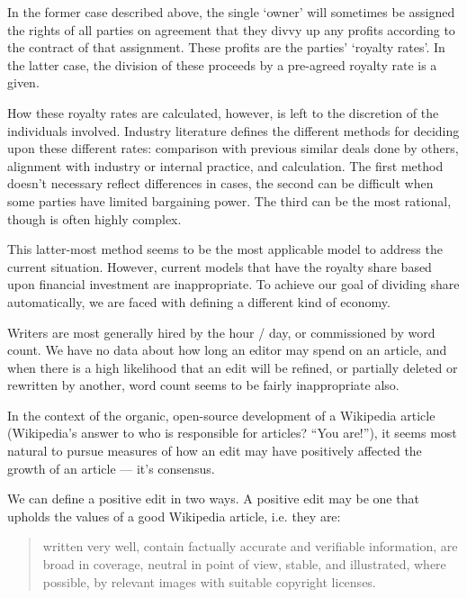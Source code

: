 In the former case described above, the single `owner' will sometimes
be assigned the rights of all parties on agreement that they divvy up
any profits according to the contract of that assignment. These
profits are the parties' `royalty rates'. In the latter case, the
division of these proceeds by a pre-agreed royalty rate is a given.

How these royalty rates are calculated, however, is left to the
discretion of the individuals involved. Industry literature defines
the different methods for deciding upon these different rates:
comparison with previous similar deals done by others, alignment with
industry or internal practice, and calculation. The first method
doesn't necessary reflect differences in cases, the second can be
difficult when some parties have limited bargaining power. The third
can be the most rational, though is often highly
complex.\cite{simplemethod}

This latter-most method seems to be the most applicable model to
address the current situation. However, current models that have the
royalty share based upon financial investment are
inappropriate.\cite{simplemethod} To achieve our goal of dividing
share automatically, we are faced with defining a different kind of
economy.

Writers are most generally hired by the hour / day, or commissioned by
word count.\cite{copywriter-rates} We have no data about how long an
editor may spend on an article, and when there is a high likelihood
that an edit will be refined, or partially deleted or rewritten by
another, word count seems to be fairly inappropriate also.

In the context of the organic, open-source development of a Wikipedia
article (Wikipedia's answer to who is responsible for articles? ``You
are!''\cite{wiki-you-are}), it seems most natural to pursue measures
of how an edit may have positively affected the growth of an article
--- it's consensus.

We can define a positive edit in two ways. A positive edit may
be one that upholds the values of a good Wikipedia article, i.e. they
are:

\begin{quote}
  written very well, contain factually accurate and verifiable
  information, are broad in coverage, neutral in point of view,
  stable, and illustrated, where possible, by relevant images with
  suitable copyright licenses.\cite{wiki-good}
\end{quote}

